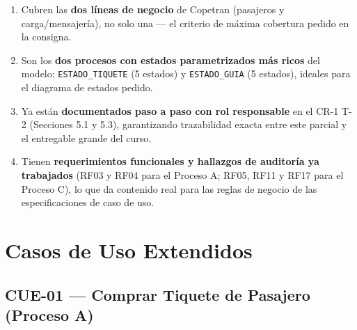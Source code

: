 \documentclass[11pt,a4paper]{article}
\begin{document}
\begin{enumerate}
  \item Cubren las \textbf{dos líneas de negocio} de Copetran (pasajeros y carga/mensajería), no
  solo una --- el criterio de máxima cobertura pedido en la consigna.
  \item Son los \textbf{dos procesos con estados parametrizados más ricos} del modelo:
  \texttt{ESTADO_TIQUETE} (5 estados) y \texttt{ESTADO_GUIA} (5 estados), ideales para el diagrama
  de estados pedido.
  \item Ya están \textbf{documentados paso a paso con rol responsable} en el CR-1 T-2 (Secciones
  5.1 y 5.3), garantizando trazabilidad exacta entre este parcial y el entregable grande del
  curso.
  \item Tienen \textbf{requerimientos funcionales y hallazgos de auditoría ya trabajados} (RF03 y
  RF04 para el Proceso A; RF05, RF11 y RF17 para el Proceso C), lo que da contenido real para las
  reglas de negocio de las especificaciones de caso de uso.
\end{enumerate}

\section{Casos de Uso Extendidos}

\subsection{CUE-01 --- Comprar Tiquete de Pasajero (Proceso A)}
\end{document}
